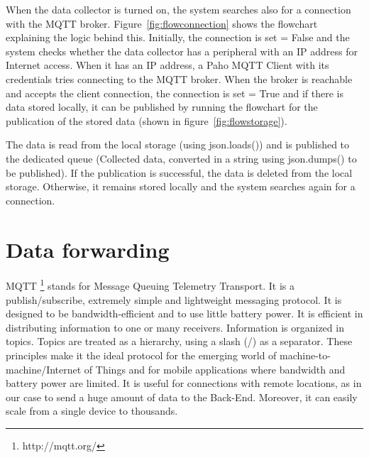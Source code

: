 When the data collector is turned on, the system searches also for a connection with the MQTT broker. Figure~\ref{fig:flowconnection} shows the flowchart explaining the logic behind this. Initially, the connection is set = False and the system checks whether the data collector has a peripheral with an IP address for Internet access.
When it has an IP address, a Paho MQTT Client with its credentials tries connecting to the MQTT broker. When the broker is reachable and accepts the client connection, the connection is set = True and if there is data stored locally, it can be published by running the flowchart for the publication of the stored data (shown in figure~\ref{fig:flowstorage}).


The data is read from the local storage (using json.loads()) and is published to the dedicated queue (Collected data, converted in a string using json.dumps() to be published). 
If the publication is successful, the data is deleted from the local storage. Otherwise, it remains stored locally and the system searches again for a connection.


\section{Data forwarding}
\label{sec:forward}
\vspace{0.2 cm} 

MQTT \footnote{ http://mqtt.org/ } stands for Message Queuing Telemetry Transport. It is a publish/subscribe, extremely simple and lightweight messaging protocol. It is designed to be bandwidth-efficient and to use little battery power. It is efficient in distributing information to one or many receivers. Information is organized in topics. Topics are treated as a hierarchy, using a slash (/) as a separator. These principles make it the ideal protocol for the emerging world of machine-to-machine/Internet of Things and for mobile applications where bandwidth and battery power are limited. It is useful for connections with remote locations, as in our case to send a huge amount of data to the Back-End. Moreover, it can easily scale from a single device to thousands.

